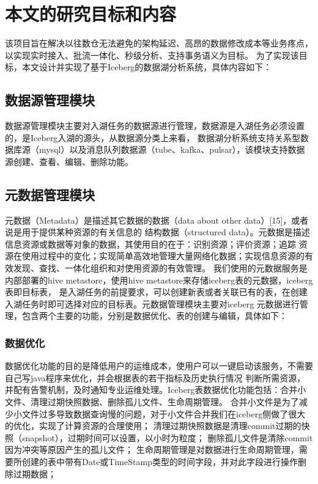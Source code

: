 \section{本文的研究目标和内容}

该项目旨在解决以往数仓无法避免的架构延迟、高昂的数据修改成本等业务疼点，以实现实时接入、批流一体化、秒级分析、支持事务语义为目标。
为了实现该目标，本文设计并实现了基于Iceberg的数据湖分析系统，具体内容如下：

\subsection{数据源管理模块}

数据源管理模块主要对入湖任务的数据源进行管理，数据源是入湖任务必须设置的，是Iceberg入湖的源头，从数据源分类上来看，
数据湖分析系统支持关系型数据库源（mysql）以及消息队列数据源（tube、kafka、pulsar），该模块支持数据源创建、查看、编辑、删除功能。

\subsection{元数据管理模块}

元数据（Metadata）是描述其它数据的数据（data about other data）[15]，或者说是用于提供某种资源的有关信息的
结构数据（structured data）。元数据是描述信息资源或数据等对象的数据，其使用目的在于：识别资源；评价资源；追踪
资源在使用过程中的变化；实现简单高效地管理大量网络化数据；实现信息资源的有效发现、查找、一体化组织和对使用资源的有效管理。
我们使用的元数据服务是内部部署的hive metastore，使用hive metastore来存储iceberg表的元数据，iceberg表即目标表，
是入湖任务的前提要求，可以创建新表或者关联已有的表，在创建入湖任务时即可选择对应的目标表。元数据管理模块主要对iceberg
元数据进行管理，包含两个主要的功能，分别是数据优化、表的创建与编辑，具体如下：

\subsubsection{数据优化}

数据优化功能的目的是降低用户的运维成本，使用户可以一键启动该服务，不需要自己写java程序来优化，并会根据表的若干指标及历史执行情况
判断所需资源，并配有告警机制，及时通知专业运维处理。Iceberg表数据优化功能包括：合并小文件、清理过期快照数据、删除孤儿文件、生命周期管理。
合并小文件是为了减少小文件过多导致数据查询慢的问题，对于小文件合并我们在iceberg侧做了很大的优化，实现了计算资源的合理使用；
清理过期快照数据是清理commit过期的快照（snapshot），过期时间可以设置，以小时为粒度；
删除孤儿文件是清除commit因为冲突等原因产生的孤儿文件；
生命周期管理是对数据进行生命周期管理，需要所创建的表中带有Date或TimeStamp类型的时间字段，并对此字段进行操作删除过期数据；

